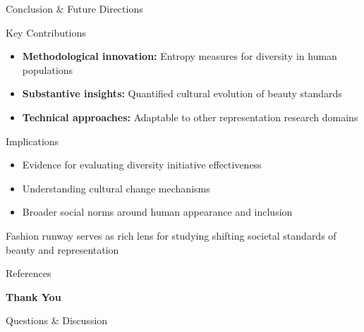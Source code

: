 \documentclass[aspectratio=169,xcolor=dvipsnames,10pt]{beamer}
\begin{document}
\begin{frame}{Conclusion \& Future Directions}
    \begin{block}{Key Contributions}
        \begin{itemize}
            \item \textbf{Methodological innovation:} Entropy measures for diversity in human populations
            \item \textbf{Substantive insights:} Quantified cultural evolution of beauty standards
            \item \textbf{Technical approaches:} Adaptable to other representation research domains
        \end{itemize}
    \end{block}
    
    \begin{alertblock}{Implications}
        \begin{itemize}
            \item Evidence for evaluating diversity initiative effectiveness
            \item Understanding cultural change mechanisms
            \item Broader social norms around human appearance and inclusion
        \end{itemize}
    \end{alertblock}
    
    \begin{examples}
        Fashion runway serves as rich lens for studying shifting societal standards of beauty and representation
    \end{examples}
\end{frame}


\begin{frame}{References}

\end{frame}


\begin{frame}
    \Huge{\centerline{\textbf{Thank You}}}
    \vspace{1em}
    \Large{\centerline{Questions \& Discussion}}
\end{frame}

\end{document}

